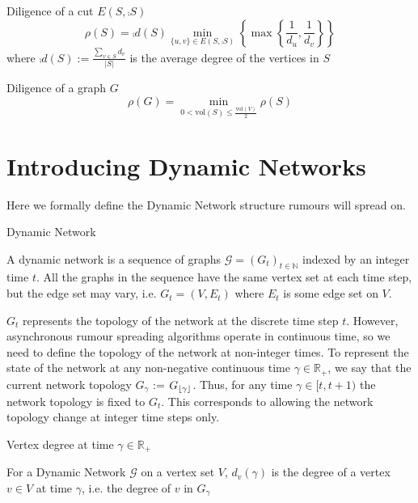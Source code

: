 \begin{definition}
	Diligence of a cut $ E(S, \comp{S}) $
	$$
		\rho(S) = \comp{d}(S) \min_{\{u, v\} \in E(S, \comp{S}) } \left\{ \max \left\{ \frac{1}{d_u},\frac{1}{d_v} \right\} \right\}
	$$ 
	where $\comp{d}(S) := \frac{\sum_{v \in S} d_v}{|S|}$ is the average degree of the vertices in $S$
\end{definition}

\begin{definition} %
	Diligence of a graph $G$
	$$
		\rho(G) = \min_{0 < \text{vol}(S) \leq \frac{\text{vol}(V)}{2}} \rho(S) 
	$$
\end{definition}

\section{Introducing Dynamic Networks}

Here we formally define the Dynamic Network structure rumours will spread on.

\begin{definition}
	Dynamic Network

	\noindent
	A dynamic network is a sequence of graphs $\mathcal{G} = (G_t)_{t \in \mathbb{N}}$ indexed by an integer time $t$. All the graphs in the sequence have the same vertex set at each time step, but the edge set may vary, i.e.  $G_t = (V, E_t)$ where $E_t$ is some edge set on $V$.
\end{definition}

$G_t$ represents the topology of the network at the discrete time step $t$. However, asynchronous rumour spreading algorithms operate in continuous time, so we need to define the topology of the network at non-integer times. To represent the state of the network at any non-negative continuous time $\gamma \in \mathbb{R}_+$, we say that the current network topology $G_\gamma$ := $G_{\lfloor\gamma\rfloor}$. Thus, for any time $\gamma \in [t, t + 1)$ the network topology is fixed to $G_t$. This corresponds to allowing the network topology change at integer time steps only.


\begin{definition}
	Vertex degree at time $\gamma \in \mathbb{R}_+ $ 

	\noindent
	For a Dynamic Network $\mathcal{G}$ on a vertex set $V$, $d_v(\gamma)$ is the degree of a vertex $v \in V$ at time $\gamma$, i.e. the degree of $v$ in $G_\gamma$
\end{definition}


